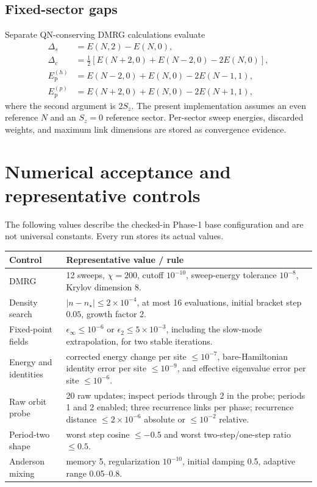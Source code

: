 \documentclass[11pt]{article}
\newcommand{\Ep}{E_{\mathrm p}}
\begin{document}
\subsection{Fixed-sector gaps}

Separate QN-conserving DMRG calculations evaluate
\begin{align}
 \Delta_s &= E(N,2)-E(N,0),\\
 \Delta_c &= \tfrac12\left[E(N+2,0)+E(N-2,0)-2E(N,0)\right],\\
 \Ep^{(h)} &= E(N-2,0)+E(N,0)-2E(N-1,1),\\
 \Ep^{(p)} &= E(N+2,0)+E(N,0)-2E(N+1,1),
\end{align}
where the second argument is \(2S_z\).  The present implementation assumes an
even reference \(N\) and an \(S_z=0\) reference sector.  Per-sector sweep
energies, discarded weights, and maximum link dimensions are stored as
convergence evidence.

\section{Numerical acceptance and representative controls}

The following values describe the checked-in Phase-1 base configuration and
are not universal constants.  Every run stores its actual values.
\begin{center}
\begin{tabularx}{\textwidth}{lX}
\toprule
Control & Representative value / rule \\
\midrule
DMRG & 12 sweeps, \(\chi=200\), cutoff \(10^{-10}\), sweep-energy tolerance
  \(10^{-8}\), Krylov dimension 8. \\
Density search & \(|n-n_\star|\le2\times10^{-4}\), at most 16 evaluations,
  initial bracket step \(0.05\), growth factor 2. \\
Fixed-point fields & \(\epsilon_\infty\le10^{-6}\) or
  \(\epsilon_2\le5\times10^{-3}\), including the slow-mode extrapolation, for
  two stable iterations. \\
Energy and identities & corrected energy change per site \(\le10^{-7}\),
  bare-Hamiltonian identity error per site \(\le10^{-9}\), and effective
  eigenvalue error per site \(\le10^{-6}\). \\
Raw orbit probe & 20 raw updates; inspect periods through 2 in the probe;
  periods 1 and 2 enabled; three recurrence links per phase; recurrence
  distance \(\le2\times10^{-6}\) absolute or \(\le10^{-2}\) relative. \\
Period-two shape & worst step cosine \(\le-0.5\) and worst two-step/one-step
  ratio \(\le0.5\). \\
Anderson mixing & memory 5, regularization \(10^{-10}\), initial damping 0.5,
  adaptive range 0.05--0.8. \\
\bottomrule
\end{tabularx}
\end{center}
\end{document}
